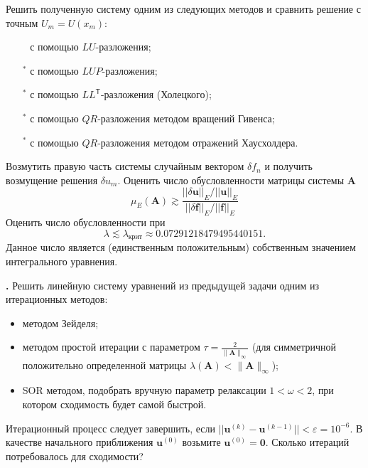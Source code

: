 \documentclass[12pt]{article}
\newcounter{task}
\newcommand{\problem}{\par\textbf{\stepcounter{task}\thetask. }}
\begin{document}
Решить полученную систему одним из следующих методов и сравнить решение с точным
$U_m = U\left(x_m\right)$:
\begin{itemize}
\item[\textbullet${}^{\phantom{*}}$] с помощью $LU$-разложения;
\item[\textbullet${}^{*}$] с помощью $LUP$-разложения;
\item[\textbullet${}^{*}$] с помощью $LL^\mathsf{T}$-разложения (Холецкого);
\item[\textbullet${}^{*}$] с помощью $QR$-разложения методом вращений Гивенса;
\item[\textbullet${}^{*}$] с помощью $QR$-разложения методом отражений
Хаусхолдера.
\end{itemize}
Возмутить правую часть системы случайным вектором $\delta f_n$ и получить
возмущение решения $\delta u_m$. Оценить число обусловленности матрицы
системы $\mathbf{A}$
\[
\mu_E(\mathbf{A}) \gtrsim
\frac
{||\delta \mathbf{u}||_E/||\mathbf{u}||_E}
{||\delta \mathbf{f}||_E/||\mathbf{f}||_E}
\]
Оценить число обусловленности при
\[
\lambda \lesssim \lambda_\text{крит} \approx 0.07291218479495440151.
\]
Данное число является (единственным положительным) собственным значением интегрального уравнения.

\problem Решить линейную систему уравнений из предыдущей задачи одним из
итерационных методов:
\begin{itemize}
\item методом Зейделя;
\item методом простой итерации с параметром $\tau =
\frac{2}{\|\mathbf{A}\|_\infty}$ (для симметричной положительно определенной
матрицы $\lambda(\mathbf{A}) < \|\mathbf{A}\|_\infty$);
\item SOR методом, подобрать вручную параметр релаксации $1 < \omega < 2$, при
котором сходимость будет самой быстрой.
\end{itemize}
Итерационный процесс следует завершить, если $||\mathbf{u}^{(k)} - \mathbf{u}^{(k-1)}|| <
\varepsilon = 10^{-6}$. В качестве начального приближения $\mathbf{u}^{(0)}$ возьмите
$\mathbf{u}^{(0)} = \mathbf{0}$. Сколько итераций потребовалось для сходимости?
\end{document}
